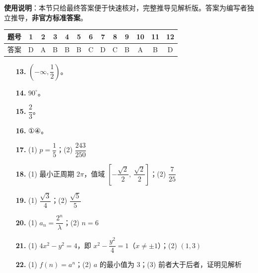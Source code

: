 
\begin{gknotice}
\textbf{使用说明}：本节只给最终答案便于快速核对，完整推导见解析版。答案为编写者独立推导，\textbf{非官方标准答案}。
\end{gknotice}

\begin{center}\begin{tabular}{ccccccccccccc}
\toprule
题号 & 1 & 2 & 3 & 4 & 5 & 6 & 7 & 8 & 9 & 10 & 11 & 12 \\
\midrule
答案 & D & A & B & B & B & C & D & C & B & A & B & D \\
\bottomrule
\end{tabular}\end{center}

\begin{itemize}[leftmargin=2.6em]
  \item[\textbf{13.}] $\left(-\infty,\dfrac12\right)$。
  \item[\textbf{14.}] $90^\circ$。
  \item[\textbf{15.}] $\dfrac23$。
  \item[\textbf{16.}] ①④。
\end{itemize}

\begin{itemize}[leftmargin=2.6em]
  \item[\textbf{17.}] (1) $p=\dfrac15$；(2) $\dfrac{243}{250}$
  \item[\textbf{18.}] (1) 最小正周期 $2\pi$，值域 $\left[-\dfrac{\sqrt2}2,\ \dfrac{\sqrt2}2\right]$；(2) $\dfrac7{25}$
  \item[\textbf{19.}] (1) $\dfrac{\sqrt3}4$；(2) $\dfrac{\sqrt5}5$
  \item[\textbf{20.}] (1) $a_n=\dfrac{2^n}{\lambda}$；(2) $n=6$
  \item[\textbf{21.}] (1) $4x^2-y^2=4$，即 $x^2-\dfrac{y^2}4=1$（$x\neq\pm1$）；(2) $(1,3)$
  \item[\textbf{22.}] (1) $f(n)=a^n$；(2) $a$ 的最小值为 $3$；(3) 前者大于后者，证明见解析
\end{itemize}
